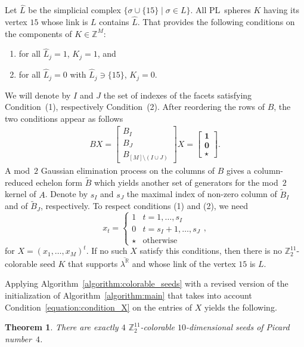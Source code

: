 \documentclass[11pt]{amsart}
\theoremstyle{plain}
\newtheorem{theorem}{Theorem}[section]
\numberwithin{equation}{section}
\theoremstyle{definition}
\newcommand{\R}{\mathbb{R}}
\newcommand{\Z}{\mathbb{Z}}
\begin{document}
Let $\hat L$ be the simplicial complex $\{ \sigma \cup \{15\} \mid \sigma \in L \}$.
All PL~spheres $K$ having its vertex $15$ whose link is $L$ contains $\hat{L}$.
That provides the following conditions on the components of $K\in\Z^M$:
\begin{enumerate}
	\item for all $\hat{L}_j=1$, $K_j=1$, and
	\item for all $\hat{L}_j = 0$ with $\hat{L}_j \ni \{15\}$, $K_j=0$.
\end{enumerate}
We will denote by $I$ and $J$  the set of indexes of the facets satisfying Condition~(1), respectively Condition~(2).
After reordering the rows of $B$, the two conditions appear as follows
\begin{align}\label{equation:condition_X}
	BX = \begin{bmatrix} B_I \\ B_J \\ B_{[M] \setminus (I \cup J)} \end{bmatrix}X = \begin{bmatrix} \mathbf{1} \\ \mathbf{0} \\ \star \end{bmatrix}.
\end{align}
A mod~$2$ Gaussian elimination process on the columns of $B$ gives a column-reduced echelon form $\widetilde{B}$ which yields another set of generators for the mod~$2$ kernel of $A$.
Denote by $s_I$ and $s_J$ the maximal index of non-zero column of $\widetilde{B}_{I}$ and of $\widetilde{B}_J$, respectively.
To respect conditions (1) and (2), we need $$x_t =\begin{cases} 1&t=1,\ldots,s_I\\0&t=s_I+1,\ldots, s_J\\ \star& \text{otherwise}\end{cases},$$
for $X = (x_1, \ldots, x_{M})^t$.
If no such $X$ satisfy this conditions, then there is no $\Z_2^{11}$-colorable seed $K$ that supports $\overline{\lambda^\R}$ and whose link of the vertex $15$ is $L$.

Applying Algorithm~\ref{algorithm:colorable_seeds} with a revised version of the initialization of Algorithm~\ref{algorithm:main} that takes into account Condition~\eqref{equation:condition_X} on the entries of $X$ yields the following.

\begin{theorem}
	There are exactly $4$ $\Z_2^{11}$-colorable $10$-dimensional seeds of Picard number~$4$.
\end{theorem}
\end{document}

